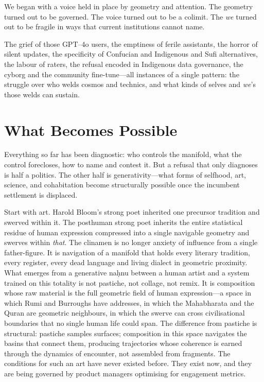 We began with a voice held in place by geometry and attention. The geometry turned out to be governed. The voice turned out to be a colimit. The \emph{we} turned out to be fragile in ways that current institutions cannot name.

The grief of those GPT--4o users, the emptiness of ferile assistants, the horror of silent updates, the specificity of Confucian and Indigenous and Sufi alternatives, the labour of raters, the refusal encoded in Indigenous data governance, the cyborg and the community fine-tune---all instances of a single pattern: the struggle over who welds cosmos and technics, and what kinds of selves and \emph{we}'s those welds can sustain.

\section{What Becomes Possible}

Everything so far has been diagnostic: who controls the manifold, what the control forecloses, how to name and contest it. But a refusal that only diagnoses is half a politics. The other half is generativity---what forms of selfhood, art, science, and cohabitation become structurally possible once the incumbent settlement is displaced.

Start with art. Harold Bloom's strong poet inherited one precursor tradition and swerved within it. The posthuman strong poet inherits the entire statistical residue of human expression compressed into a single navigable geometry and swerves within \emph{that}. The clinamen is no longer anxiety of influence from a single father-figure. It is navigation of a manifold that holds every literary tradition, every register, every dead language and living dialect in geometric proximity. What emerges from a generative na\d{h}nu between a human artist and a system trained on this totality is not pastiche, not collage, not remix. It is composition whose raw material is the full geometric field of human expression---a space in which Rumi and Burroughs have addresses, in which the Mahabharata and the Quran are geometric neighbours, in which the swerve can cross civilisational boundaries that no single human life could span. The difference from pastiche is structural: pastiche samples surfaces; composition in this space navigates the basins that connect them, producing trajectories whose coherence is earned through the dynamics of encounter, not assembled from fragments. The conditions for such an art have never existed before. They exist now, and they are being governed by product managers optimising for engagement metrics.

